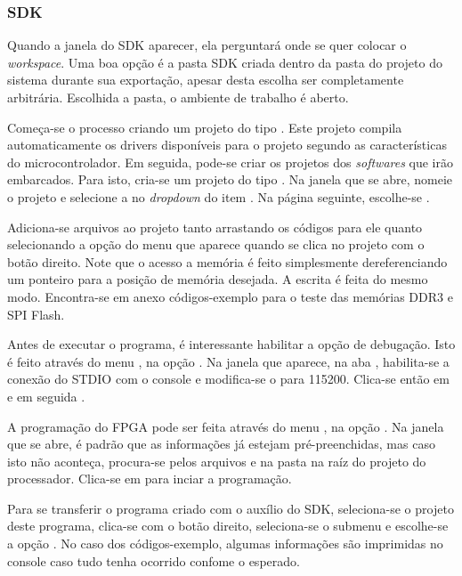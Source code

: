 \documentclass[11pt,a4paper,oneside]{book}
\begin{document}
\subsubsection{SDK}
Quando a janela do SDK aparecer, ela perguntará onde se quer colocar o \textit{workspace}.
Uma boa opção é a pasta SDK criada dentro da pasta do projeto do sistema durante sua exportação, apesar desta escolha ser completamente arbitrária.
Escolhida a pasta, o ambiente de trabalho é aberto.

Começa-se o processo criando um projeto do tipo .
Este projeto compila automaticamente os drivers disponíveis para o projeto segundo as características do microcontrolador.
Em seguida, pode-se criar os projetos dos \textit{softwares} que irão embarcados.
Para isto, cria-se um projeto do tipo .
Na janela que se abre, nomeie o projeto e selecione a  no \textit{dropdown} do item .
Na página seguinte, escolhe-se .

Adiciona-se arquivos ao projeto tanto arrastando os códigos para ele quanto selecionando a opção  do menu que aparece quando se clica no projeto com o botão direito.
Note que o acesso a memória é feito simplesmente dereferenciando um ponteiro para a posição de memória desejada.
A escrita é feita do mesmo modo.
Encontra-se em anexo códigos-exemplo para o teste das memórias DDR3 e SPI Flash.

Antes de executar o programa, é interessante habilitar a opção de debugação.
Isto é feito através do menu , na opção .
Na janela que aparece, na aba , habilita-se a conexão do STDIO com o console e modifica-se o  para 115200.
Clica-se então em  e em seguida .

A programação do FPGA pode ser feita através do menu , na opção .
Na janela que se abre, é padrão que as informações já estejam pré-preenchidas, mas caso isto não aconteça, procura-se pelos arquivos  e  na pasta  na raíz do projeto do processador.
Clica-se em  para inciar a programação.

Para se transferir o programa criado com o auxílio do SDK, seleciona-se o projeto deste programa, clica-se com o botão direito, seleciona-se o submenu  e escolhe-se a opção .
No caso dos códigos-exemplo, algumas informações são imprimidas no console caso tudo tenha ocorrido confome o esperado.
\end{document}
